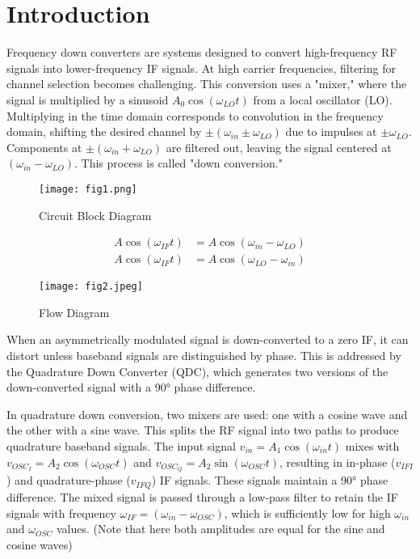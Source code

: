\documentclass[conference]{IEEEtran}
\begin{document}
\section{Introduction}
Frequency down converters are systems designed to convert high-frequency RF signals into lower-frequency IF signals. At high carrier frequencies, filtering for channel selection becomes challenging. This conversion uses a "mixer," where the signal is multiplied by a sinusoid $A_0 \cos(\omega_{LO} t)$ from a local oscillator (LO). Multiplying in the time domain corresponds to convolution in the frequency domain, shifting the desired channel by $\pm(\omega_{in} \pm \omega_{LO})$ due to impulses at $\pm \omega_{LO}$. Components at $\pm(\omega_{in} + \omega_{LO})$ are filtered out, leaving the signal centered at $(\omega_{in} - \omega_{LO})$. This process is called "down conversion."

\begin{figure}[htbp]
    \centering
    \texttt{[image: fig1.png]}
    \caption{Circuit Block Diagram}
\end{figure}
\vspace{-0.5cm}
\begin{align}
A \cos(\omega_{IF} t) &= A \cos(\omega_{in} - \omega_{LO}) \tag{i} \\
A \cos(\omega_{IF} t) &= A \cos(\omega_{LO} - \omega_{in}) \tag{ii}
\end{align}



\begin{figure}[htbp]
    \centering
    \texttt{[image: fig2.jpeg]}
    \caption{Flow Diagram}
\end{figure}

When an asymmetrically modulated signal is down-converted to a zero IF, it can distort unless baseband signals are distinguished by phase. This is addressed by the Quadrature Down Converter (QDC), which generates two versions of the down-converted signal with a 90° phase difference.

In quadrature down conversion, two mixers are used: one with a cosine wave and the other with a sine wave. This splits the RF signal into two paths to produce quadrature baseband signals. The input signal $v_{in} = A_1 \cos(\omega_{in} t)$ mixes with $v_{OSC_I} = A_2 \cos(\omega_{OSC} t)$ and $v_{OSC_Q} = A_2 \sin(\omega_{OSC} t)$, resulting in in-phase ($v_{IFI}$) and quadrature-phase ($v_{IFQ}$) IF signals. These signals maintain a 90° phase difference. The mixed signal is passed through a low-pass filter to retain the IF signals with frequency $\omega_{IF} = (\omega_{in} - \omega_{OSC})$, which is sufficiently low for high $\omega_{in}$ and $\omega_{OSC}$ values. (Note that here both amplitudes are equal for the sine and cosine waves)
\end{document}
